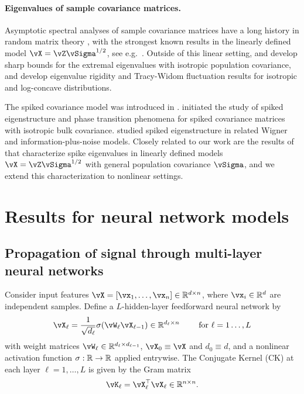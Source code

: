 \paragraph{Eigenvalues of sample covariance matrices.} Asymptotic spectral
analyses of sample covariance matrices have a long history in random matrix
theory
\citep{marchenko1967,silverstein1995strong,silverstein1995empirical,bai1998no},
with the strongest known results in the linearly defined model
$\vX=\vZ\vSigma^{1/2}$, see e.g.\ \cite{bloemendal2014isotropic,knowles2017anisotropic}. Outside of this linear setting, \cite{srivastava2013covariance} and
\cite{chafai2018convergence} develop sharp bounds for the extremal eigenvalues
with isotropic population covariance, and \cite{bao2022extreme} develop
eigenvalue rigidity and Tracy-Widom fluctuation results for isotropic and log-concave distributions.

The spiked covariance model was introduced in \cite{johnstone2001distribution}.
\cite{baik2005phase,baik2006eigenvalues,paul2007asymptotics} initiated the study
of spiked eigenstructure and phase transition phenomena for spiked
covariance matrices with isotropic bulk covariance.
\cite{peche2006largest,benaych2011eigenvalues,benaych2012singular,capitaine2013additive,capitaine2018limiting}
studied spiked eigenstructure in related Wigner and information-plus-noise
models. Closely related to our work are the results of
\cite{bai2012sample} that characterize spike eigenvalues in linearly
defined models $\vX=\vZ\vSigma^{1/2}$ with general population covariance
$\vSigma$, and we extend this characterization to nonlinear settings.

\section{Results for neural network models}\label{sec:main_results}

\subsection{Propagation of signal through multi-layer neural networks}\label{sec:spike_CK}

Consider input features $\vX=[\vx_1,\ldots,\vx_n]\in\R^{d\times n}$, where
$\vx_i\in\R^d$ are independent samples. Define a $L$-hidden-layer feedforward neural network by
\begin{equation}\label{eq:NN}
    \vX_\ell=\frac{1}{\sqrt{d_\ell}}\sigma (\vW_\ell\vX_{\ell-1}) \in \R^{d_\ell
\times n} \qquad \text{ for } \ell=1\ldots,L
\end{equation}
with weight matrices $\vW_\ell \in \R^{d_\ell\times d_{\ell-1}}$, 
$\vX_0 \equiv \vX$ and $d_0 \equiv d$,
and a nonlinear activation function $\sigma:\mathbb{R} \to \mathbb{R}$ applied entrywise. The
Conjugate Kernel (CK) at each layer $\ell=1,\ldots,L$ is given by the Gram matrix
\begin{equation}\label{eq:K_L}
	\vK_\ell=\vX_\ell^\top\vX_\ell \in \R^{n \times n}.
\end{equation}

